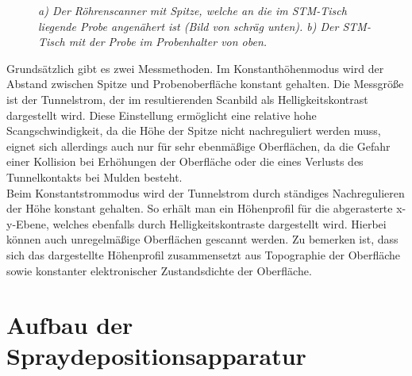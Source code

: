 \begin{figure}[H]
\centering
\sffamily

\caption{\textit{a) Der Röhrenscanner mit Spitze, welche an die im STM-Tisch
liegende Probe angenähert ist (Bild von schräg unten). b) Der STM-Tisch mit der
Probe im Probenhalter von oben.}}
\label{stmaufbau}
\end{figure}

Grundsätzlich gibt es zwei Messmethoden. Im Konstanthöhenmodus wird der Abstand zwischen Spitze und
Probenoberfläche konstant gehalten. Die Messgröße ist der Tunnelstrom, der im resultierenden
Scanbild als Helligkeitskontrast dargestellt wird. Diese Einstellung ermöglicht eine relative hohe
Scangschwindigkeit, da die Höhe der Spitze nicht nachreguliert werden muss, eignet sich
allerdings auch nur für sehr ebenmäßige Oberflächen, da die Gefahr einer Kollision bei Erhöhungen
der Oberfläche oder die eines Verlusts des Tunnelkontakts bei Mulden besteht.
\\
Beim Konstantstrommodus wird der Tunnelstrom durch ständiges Nachregulieren der Höhe konstant
gehalten. So erhält man ein Höhenprofil für die abgerasterte x-y-Ebene, welches ebenfalls durch
Helligkeitskontraste dargestellt wird. Hierbei können auch unregelmäßige Oberflächen gescannt
werden. Zu bemerken ist, dass sich das dargestellte Höhenprofil zusammensetzt aus Topographie der
Oberfläche sowie konstanter elektronischer Zustandsdichte der Oberfläche.

\FloatBarrier

\section{Aufbau der Spraydepositionsapparatur}


